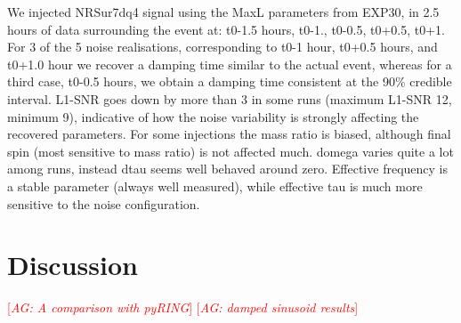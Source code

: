 \documentclass[twocolumn,prd,superscriptaddress,amsfonts,amssymb,amsmath,preprintnumbers]{revtex4-1}
\newcommand{\abhi}[1]{\textcolor{red}{[\textit{AG: #1}]}}
\begin{document}
We injected NRSur7dq4 signal using the MaxL parameters from EXP30, in 2.5 hours of data surrounding the event at: t0-1.5 hours, t0-1., t0-0.5, t0+0.5, t0+1. For 3 of the 5 noise realisations, corresponding to t0-1 hour, t0+0.5 hours, and t0+1.0 hour we recover a damping time similar to the actual event, whereas for a third case, t0-0.5 hours, we obtain a damping time consistent at the 90\% credible interval. L1-SNR goes down by more than 3 in some runs (maximum L1-SNR 12, minimum 9), indicative of how the noise variability is strongly affecting the recovered parameters. For some injections the mass ratio is biased, although final spin (most sensitive to mass ratio) is not affected much.  domega varies quite a lot among runs, instead dtau seems well behaved around zero. Effective frequency is a stable parameter (always well measured), while effective tau is much more sensitive to the noise configuration.  


\section{Discussion}\label{sec:discussion}

\abhi{A comparison with pyRING}
\abhi{damped sinusoid results}

%


\end{document}
